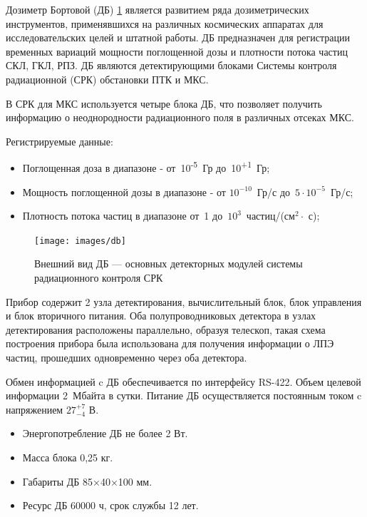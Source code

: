 Дозиметр Бортовой (ДБ) \ref{fig:db} является развитием ряда дозиметрических инструментов, применявшихся на различных космических аппаратах для исследовательских целей и штатной работы. ДБ предназначен для регистрации временных вариаций мощности поглощенной дозы и плотности потока частиц СКЛ, ГКЛ, РПЗ. ДБ являются детектирующими блоками Системы контроля радиационной (СРК) обстановки ПТК и МКС.

В СРК для МКС используется четыре блока ДБ, что позволяет получить информацию о неоднородности радиационного поля в различных отсеках МКС. 

Регистрируемые данные:
\begin{itemize}
	\item 
	Поглощенная доза в диапазоне - от~10\textsuperscript{-5}~Гр  до~10\textsuperscript{+1}~Гр;  
	\item  
	Мощность поглощенной дозы в диапазоне - от $10^{-10}$~Гр/с  до~$5\cdot10^{-5}$~Гр/с;
	\item  
	Плотность потока частиц в диапазоне от~1 до~$ 10^3 $~частиц/(см$^2\cdot$ с);    		
\end{itemize}



\begin{figure}
\centering
\texttt{[image: images/db]}
\caption{Внешний вид ДБ --- основных детекторных модулей системы радиационного контроля СРК}
\label{fig:db}
\end{figure}

Прибор содержит 2 узла детектирования, вычислительный блок, блок управления и блок вторичного питания. Оба полупроводниковых детектора в узлах детектирования расположены параллельно, образуя телескоп, такая схема построения прибора была использована для получения информации о ЛПЭ частиц, прошедших одновременно через оба детектора.         


Обмен информацией c ДБ обеспечивается по интерфейсу RS-422. Объем целевой информации 2~Мбайта в сутки. Питание ДБ осуществляется постоянным током c напряжением $ 27^{+7}_{-4} $ В. 

\begin{itemize}
\item Энергопотребление ДБ не более 2 Вт.
\item Масса блока 0,25 кг.
\item Габариты ДБ 85×40×100 мм. 
\item Ресурс ДБ  60000 ч, срок службы 12 лет.
\end{itemize}


